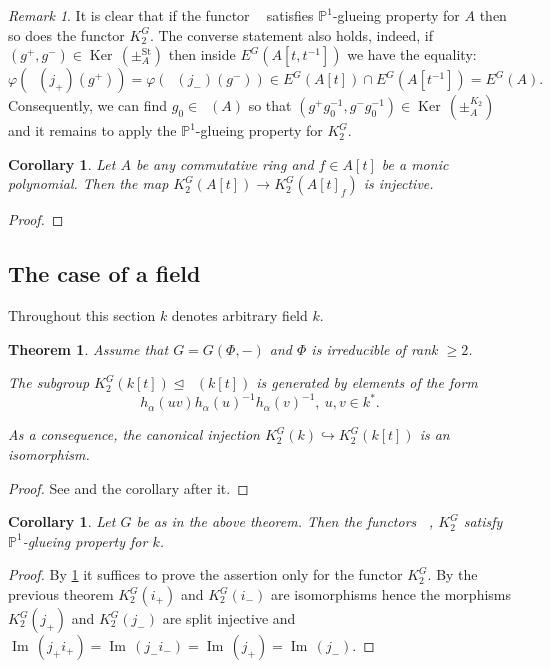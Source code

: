 \documentclass[oneside,12pt]{amsart}
\newtheorem{thm}{Theorem}
\numberwithin{equation}{section}
\numberwithin{lem}{section}
\newtheorem{cor}[lem]{Corollary}
\theoremstyle{definition}
\theoremstyle{remark}
\newtheorem{rem}[lem]{Remark}
\DeclareMathOperator{\St}{St^G}
\DeclareMathOperator{\Bigker}{Ker\,}
\DeclareMathOperator{\im}{Im\,}
\newcommand{\Stb}{\mathrm{St}}
\newcommand{\Pro}{\mathbb{P}}
\begin{document}
\begin{rem} \label{rem:stk2} It is clear that if the functor $\St$ satisfies $\Pro^1$-glueing property for $A$ then so does the functor $K_2^G$.
 The converse statement also holds, indeed, if $(g^+, g^-)\in\Bigker(\pm^{\Stb}_A)$ then inside $E^G(A[t, t^{-1}])$ we have the equality:
 $$\varphi(\St(j_+)(g^+)) = \varphi(\St(j_-)(g^-)) \in E^G(A[t]) \cap E^G(A[t^{-1}]) = E^G(A).$$
 Consequently, we can find $g_0 \in \St(A)$ so that $(g^+ g_0^{-1}, g^- g_0^{-1}) \in \Bigker(\pm_A^{K_2})$ and
 it remains to apply the $\Pro^1$-glueing property for $K_2^G$. \end{rem}

\begin{cor} Let $A$ be any commutative ring and $f\in A[t]$ be a monic polynomial.
Then the map $K_2^G(A[t])\to K_2^G(A[t]_f)$ is injective. \end{cor}
\begin{proof}
\end{proof}

\subsection{The case of a field}
Throughout this section $k$ denotes arbitrary field $k$.
\begin{thm} \label{thm:k[t]}
Assume that $G=G(\Phi, -)$ and $\Phi$ is irreducible of rank $\geq 2$.
\begin{thmlist} \item \label{satz1} The subgroup $K_2^G(k[t]) \trianglelefteq \St(k[t])$ is generated by elements of the form 
  $$h_\alpha(uv) h_\alpha(u)^{-1} h_\alpha(v)^{-1},\ u,v\in k^*.$$
 \item As a consequence, the canonical injection $K_2^G(k) \hookrightarrow K_2^G(k[t])$ is an isomorphism. \end{thmlist} \end{thm}
\begin{proof} See \cite[Satz~1]{Re75} and the corollary after it. \end{proof}

\begin{cor}\label{cor:k[t]inj} Let $G$ be as in the above theorem. Then the functors $\St$, $K_2^G$ satisfy $\Pro^1$-glueing property for $k$. \end{cor}
\begin{proof} By \cref{rem:stk2} it suffices to prove the assertion only for the functor $K_2^G$.
By the previous theorem $K_2^G(i_+)$ and $K_2^G(i_-)$ are isomorphisms hence the morphisms $K_2^G(j_+)$ and $K_2^G(j_-)$ are split injective
and $\im(j_+i_+) = \im (j_-i_-) = \im(j_+) = \im(j_-)$. \end{proof}
\end{document}
